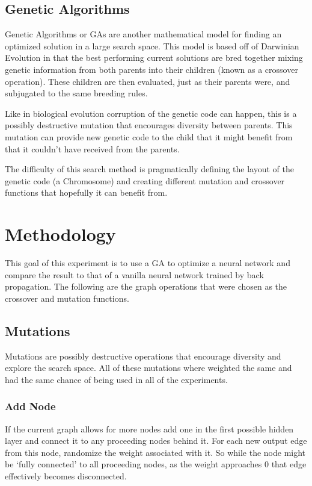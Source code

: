 \documentclass[journal]{IEEEtran}
\begin{document}
  \subsection{Genetic Algorithms}
  Genetic Algorithms or GAs are another mathematical model for finding an optimized solution
  in a large search space. This model is based off of Darwinian Evolution in that the best performing
  current solutions are bred together mixing genetic information from both parents into their
  children (known as a crossover operation). These children are then evaluated, just as their
  parents were, and subjugated to the same breeding rules.

  Like in biological evolution corruption of the genetic code can happen, this is a possibly
  destructive mutation that encourages diversity between parents. This mutation can provide new
  genetic code to the child that it might benefit from that it couldn't have received from the parents.

  The difficulty of this search method is pragmatically defining the layout of the genetic code
  (a Chromosome) and creating different mutation and crossover functions that hopefully it can benefit from.

\section{Methodology}
This goal of this experiment is to use a GA to optimize a neural network and compare the result
to that of a vanilla neural network trained by back propagation. The following are the graph
operations that were chosen as the crossover and mutation functions.
  \subsection{Mutations}
  Mutations are possibly destructive operations that encourage diversity and explore the search
  space. All of these mutations where weighted the same and had the same chance of being used
  in all of the experiments.
    \subsubsection{Add Node}
      If the current graph allows for more nodes add one in the first possible hidden layer and
      connect it to any proceeding nodes behind it. For each new output edge from this node,
      randomize the weight associated with it. So while the node might be `fully connected' to
      all proceeding nodes, as the weight approaches 0 that edge effectively becomes disconnected.
\end{document}

